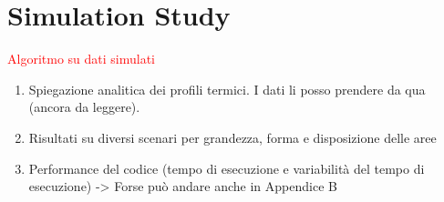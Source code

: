 \section{Simulation Study}
\label{sec:simstudy}
\textcolor{red}{Algoritmo su dati simulati}
\begin{enumerate}
    \item Spiegazione analitica dei profili termici. I dati li posso prendere da qua \cite{criales_temperature_2017, burkhardt_thermo-mechanical_2022, soundararajan_review_2021, bayat_fundamental_2021, ji_analytical_2022} (ancora da leggere).
    \item Risultati su diversi scenari per grandezza, forma e disposizione delle aree
    \item Performance del codice (tempo di esecuzione e variabilità del tempo di esecuzione) ->  Forse può andare anche in Appendice B
\end{enumerate}


